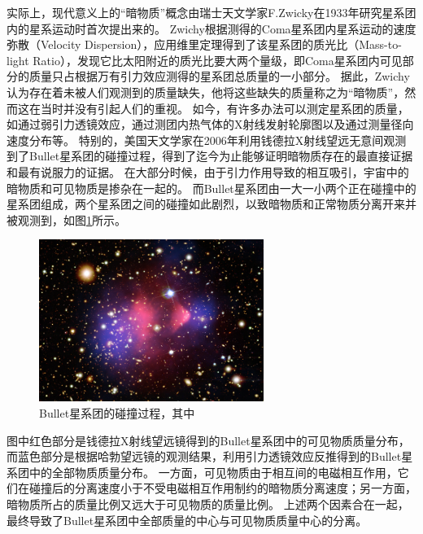 实际上，现代意义上的“暗物质”概念由瑞士天文学家F.Zwicky在1933年研究星系团内的星系运动时首次提出来的\parencite{zwicky1933spectral}。
Zwichy根据测得的Coma星系团内星系运动的速度弥散（Velocity Dispersion），应用维里定理得到了该星系团的质光比（Mass-to-light Ratio），发现它比太阳附近的质光比要大两个量级，即Coma星系团内可见部分的质量只占根据万有引力效应测得的星系团总质量的一小部分。
据此，Zwichy认为存在着未被人们观测到的质量缺失，他将这些缺失的质量称之为“暗物质”，然而这在当时并没有引起人们的重视。
如今，有许多办法可以测定星系团的质量，如通过弱引力透镜效应，通过测团内热气体的X射线发射轮廓图以及通过测量径向速度分布等。
特别的，美国天文学家在2006年利用钱德拉X射线望远无意间观测到了Bullet星系团的碰撞过程\parencite{bullet_cluster}，得到了迄今为止能够证明暗物质存在的最直接证据和最有说服力的证据。
在大部分时候，由于引力作用导致的相互吸引，宇宙中的暗物质和可见物质是掺杂在一起的。
而Bullet星系团由一大一小两个正在碰撞中的星系团组成，两个星系团之间的碰撞如此剧烈，以致暗物质和正常物质分离开来并被观测到，如图\ref{fig:introduction:bullet_cluster}所示。
\begin{figure}[htbp]
	\centering
	\includegraphics[width=0.65\textwidth]{chap/introduction/fig/bullet_cluster.jpg}
	\caption{Bullet星系团的碰撞过程，其中}
	\label{fig:introduction:bullet_cluster}
\end{figure}
图中红色部分是钱德拉X射线望远镜得到的Bullet星系团中的可见物质质量分布，而蓝色部分是根据哈勃望远镜的观测结果，利用引力透镜效应反推得到的Bullet星系团中的全部物质质量分布。
一方面，可见物质由于相互间的电磁相互作用，它们在碰撞后的分离速度小于不受电磁相互作用制约的暗物质分离速度；另一方面，暗物质所占的质量比例又远大于可见物质的质量比例。
上述两个因素合在一起，最终导致了Bullet星系团中全部质量的中心与可见物质质量中心的分离。

